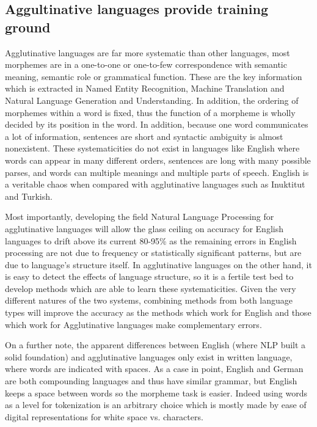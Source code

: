 \documentclass[runningheads,a4paper]{llncs}
\begin{document}
\subsection{Aggultinative languages provide training ground}
\label{sec:agglutinativebenefits}

Agglutinative languages are far more systematic than other languages, most morphemes are in a one-to-one or one-to-few correspondence with semantic meaning, semantic role or grammatical function. These are the key information which is extracted in Named Entity Recognition, Machine Translation and Natural Language Generation and Understanding. In addition, the ordering of morphemes within a word is fixed, thus the function of a morpheme is wholly decided by its position in the word. In addition, because one word communicates a lot of information, sentences are short and syntactic ambiguity is almost nonexistent. These systematicities do not exist in languages like English where words can appear in many different orders, sentences are long with many possible parses, and words can multiple meanings and multiple parts of speech. English is a veritable chaos when compared with agglutinative languages such as Inuktitut and Turkish.

Most importantly, developing the field Natural Language Processing for agglutinative languages will allow the glass ceiling on accuracy for English languages to drift above its current 80-95\% as the remaining errors in English processing are not due to frequency or statistically significant patterns, but are due to language's structure itself. In agglutinative languages on the other hand, it is easy to detect the effects of language structure, so it is a fertile test bed to develop methods which are able to learn these systematicities. Given the very different natures of the two systems, combining methods from both language types will improve the accuracy as the methods which work for English and those which work for Agglutinative languages make complementary errors. 

On a further note, the apparent differences between English (where NLP built a solid foundation) and agglutinative languages only exist in written language, where words are indicated with spaces. As a case in point, English and German are both compounding languages and thus have similar grammar, but English keeps a space between words so the morpheme task is easier. Indeed using words as a level for tokenization is an arbitrary choice which is mostly made by ease of digital representations for white space vs. characters.
\end{document}
